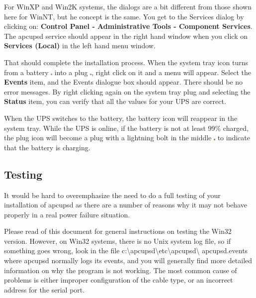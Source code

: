 {{{{{{{{{For WinXP and Win2K systems, the dialogs are a bit different from
those shown here for WinNT, but he concept is the same. You get to the
Services dialog by clicking on: {\bf Control Panel -\gt{} Administrative Tools
-\gt{} Component Services}. The apcupsd service should appear in the right
hand window when you click on {\bf Services (Local)} in the left hand menu
window.  

That should complete the installation process. When the system tray icon turns
from a battery \includegraphics{./onbatt.eps} into a plug
\includegraphics{./online.eps}, right click on it and a menu will appear.
Select the {\bf Events} item, and the Events dialogue box should appear. There
should be no error messages. By right clicking again on the system tray plug
and selecting the {\bf Status} item, you can verify that all the values for
your UPS are correct.  

When the UPS switches to the battery, the battery icon will reappear in the
system tray. While the UPS is online, if the battery is not at least 99\%
charged, the plug icon will become a plug with a lightning bolt in the middle
\includegraphics{./charging.eps} to indicate that the battery is charging. 

\label{Testing}

\subsection*{Testing}

\label{index-Windows_002c-Testing-173}
\label{index-Testing_002c-Windows-174}
It would be hard to overemphasize the need to do a full testing of your
installation of apcupsd as there are a number of reasons why it may not behave
properly in a real power failure situation.  

Please read 
 of this document for
general instructions on testing the Win32 version. However, on Win32 systems,
there is no Unix system log file, so if something goes wrong, look in the file
c:\textbackslash{}apcupsd\textbackslash{}etc\textbackslash{}apcupsd\textbackslash
{}apcupsd.events where apcupsd normally logs its events, and you will
generally find more detailed information on why the program is not working.
The most common cause of problems is either improper configuration of the
cable type, or an incorrect address for the serial port. 

}}}}}}}}}
